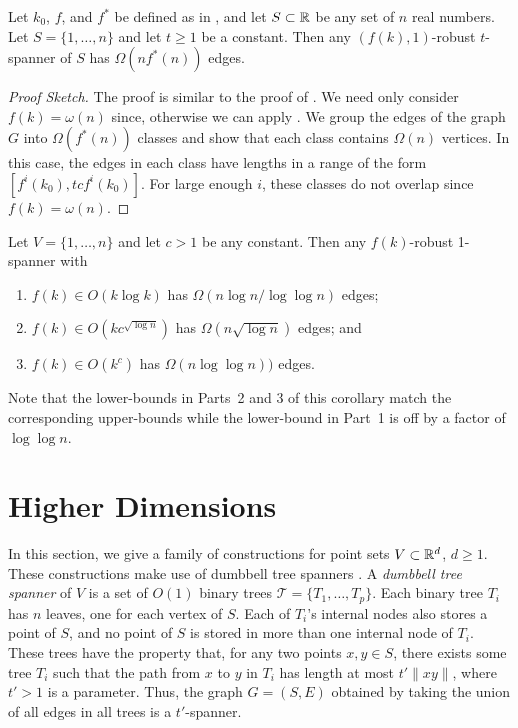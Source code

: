 \documentclass{patmorin}
\begin{document}
\begin{thm}
  Let $k_0$, $f$, and $f^*$ be defined as in , and let
  $S\subset \mathbb{R}$ be any set of $n$ real numbers.  Let $S=\{1,\ldots,n\}$
  and let $t\ge 1$ be a constant.  Then any $(f(k),1)$-robust $t$-spanner
  of $S$ has $\Omega(nf^*(n))$ edges.
\end{thm}

\begin{proof}[Proof Sketch]
  The proof is similar to the proof of .
  We need only consider $f(k)=\omega(n)$ since, otherwise we can apply
  .  We group the edges of the graph
  $G$ into $\Omega(f^*(n))$ classes and show that each class contains
  $\Omega(n)$ vertices.  In this case, the edges in each class have
  lengths in a range of the form $[f^i(k_0),tcf^{i}(k_0)]$.  For large
  enough $i$, these classes do not overlap since $f(k)=\omega(n)$.
\end{proof}

\begin{cor}
  Let $V=\{1,\ldots,n\}$ and let $c>1$ be any constant.  Then any
  $f(k)$-robust 1-spanner with
  \begin{enumerate}
    \item $f(k)\in O(k\log k)$ has $\Omega(n\log n/\log\log n)$ edges;
    \item $f(k)\in O(kc^{\sqrt{\log n}})$ has $\Omega(n\sqrt{\log n})$
      edges; and
    \item $f(k)\in O(k^{c})$ has $\Omega(n\log\log n))$ edges.
  \end{enumerate}
\end{cor}

Note that the lower-bounds in Parts~2 and 3 of this corollary match the
corresponding upper-bounds while the lower-bound in Part~1 is off by a
factor of $\log\log n$.


\section{Higher Dimensions}

In this section, we give a family of constructions for point sets
$V\subset\mathbb{R}^d$, $d\ge 1$.  These constructions make use of dumbbell
tree spanners \cite[Chapter~11]{ns07}.  A \emph{dumbbell tree spanner}
of $V$ is a set of $O(1)$ binary trees $\mathcal{T}=\{T_1,\ldots,T_p\}$.
Each binary tree $T_i$ has $n$ leaves, one for each vertex of $S$.
Each of $T_i$'s internal nodes also stores a point of $S$, and no point
of $S$ is stored in more than one internal node of $T_i$.  These trees
have the property that, for any two points $x,y\in S$, there exists some
tree $T_i$ such that the path from $x$ to $y$ in $T_i$ has length at
most $t'\|xy\|$, where $t'>1$ is a parameter.  Thus, the graph $G=(S,E)$
obtained by taking the union of all edges in all trees is a $t'$-spanner.
\end{document}
